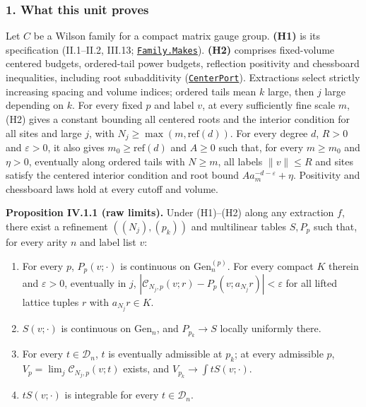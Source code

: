 \documentclass[
  letterpaper,
  11pt]{article}
\begin{document}
\subsubsection{1. What this unit proves}\label{what-this-unit-proves-19}

Let \(C\) be a Wilson family for a compact matrix gauge group.
\textbf{(H1)} is its specification (II.1--II.2, III.13;
\href{https://github.com/yang-mills-group/OpenAI-YM-20261028/blob/3456e5e75cf8d4cd558955a5c7638fba2d68f464/YM/Source/Construction.lean\#L44-L62}{\texttt{Family.Makes}}).
\textbf{(H2)} comprises fixed-volume centered budgets, ordered-tail
power budgets, reflection positivity and chessboard inequalities,
including root subadditivity
(\href{https://github.com/yang-mills-group/OpenAI-YM-20261028/blob/3456e5e75cf8d4cd558955a5c7638fba2d68f464/YM/Extraction/Center.lean\#L30-L34}{\texttt{CenterPort}}).
Extractions select strictly increasing spacing and volume indices;
ordered tails mean \(k\) large, then \(j\) large depending on \(k\). For
every fixed \(p\) and label \(v\), at every sufficiently fine scale
\(m\), (H2) gives a constant bounding all centered roots and the
interior condition for all sites and large \(j\), with
\(N_j\ge\max(m,\mathrm{ref}(d))\). For every degree \(d\), \(R>0\) and
\(\varepsilon>0\), it also gives \(m_0\ge\mathrm{ref}(d)\) and \(A\ge0\)
such that, for every \(m\ge m_0\) and \(\eta>0\), eventually along
ordered tails with \(N\ge m\), all labels \(\|v\|\le R\) and sites
satisfy the centered interior condition and root bound
\(Aa_m^{-d-\varepsilon}+\eta\). Positivity and chessboard laws hold at
every cutoff and volume.

\textbf{Proposition IV.1.1 (raw limits).} Under (H1)--(H2) along any
extraction \(f\), there exist a refinement \(((N_j),(p_k))\) and
multilinear tables \(S,P_p\) such that, for every arity \(n\) and label
list \(v\):

\begin{enumerate}
\def\labelenumi{(\alph{enumi})}
\item
  For every \(p\), \(P_p(v;\cdot)\) is continuous on
  \(\mathrm{Gen}^{(p)}_n\). For every compact \(K\) therein and
  \(\varepsilon>0\), eventually in \(j\),
  \(|\mathcal C_{N_j,p}(v;r)-P_p(v;a_{N_j}r)|<\varepsilon\) for all
  lifted lattice tuples \(r\) with \(a_{N_j}r\in K\).
\item
  \(S(v;\cdot)\) is continuous on \(\mathrm{Gen}_n\), and
  \(P_{p_k}\to S\) locally uniformly there.
\item
  For every \(t\in\mathcal D_n\), \(t\) is eventually admissible at
  \(p_k\); at every admissible \(p\),
  \(V_p=\lim_j\mathcal C_{N_j,p}(v;t)\) exists, and
  \(V_{p_k}\to\int tS(v;\cdot)\).
\item
  \(tS(v;\cdot)\) is integrable for every \(t\in\mathcal D_n\).
\end{enumerate}
\end{document}
